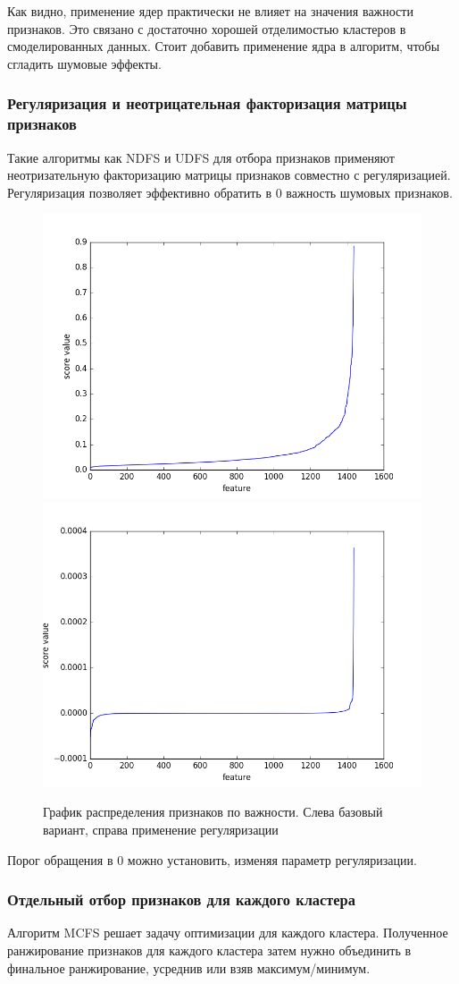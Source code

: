 Как видно, применение ядер практически не влияет на значения важности признаков. Это связано с достаточно хорошей отделимостью кластеров в смоделированных данных. Стоит добавить применение ядра в алгоритм, чтобы сгладить шумовые эффекты.
\subsubsection{Регуляризация и неотрицательная факторизация матрицы признаков}
Такие алгоритмы как NDFS и UDFS для отбора признаков применяют неотризательную факторизацию матрицы признаков совместно с регуляризацией. Регуляризация позволяет эффективно обратить в 0 важность шумовых признаков.
\begin{figure}[h]
  \includegraphics[width=0.5\linewidth]{pics/lp_unnorm_euclidean.png}
  \includegraphics[width=0.5\linewidth]{pics/ndfs_unnorm_euclidean_3c.png}
  \caption{График распределения признаков по важности. Слева базовый вариант, справа применение регуляризации}
  \label{regularization_blob}
\end{figure}

Порог обращения в 0 можно установить, изменяя параметр регуляризации. 
\subsubsection{Отдельный отбор признаков для каждого кластера}
Алгоритм MCFS решает задачу оптимизации для каждого кластера. Полученное ранжирование признаков для каждого кластера затем нужно объединить в финальное ранжирование, усреднив или взяв максимум/минимум.


